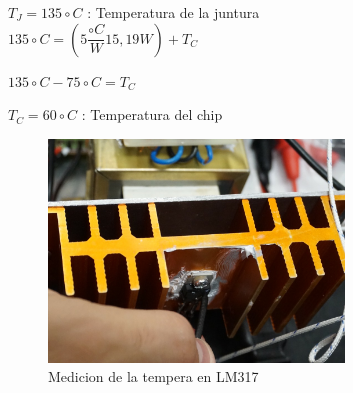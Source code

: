 $T_J = 135 \circ C$ : Temperatura de la juntura \\

$135 \circ C = (5 \dfrac{\circ C}{W} 15,19 W) + T_C $

$135 \circ C - 75 \circ C = T_C$

$T_C = 60 \circ C$ : Temperatura del chip

\begin{figure}[H]
  \centering
  \includegraphics[width=0.70\textwidth]{images/medicionTemperatura.png}
  \caption{Medicion de la tempera en LM317}
\end{figure}

